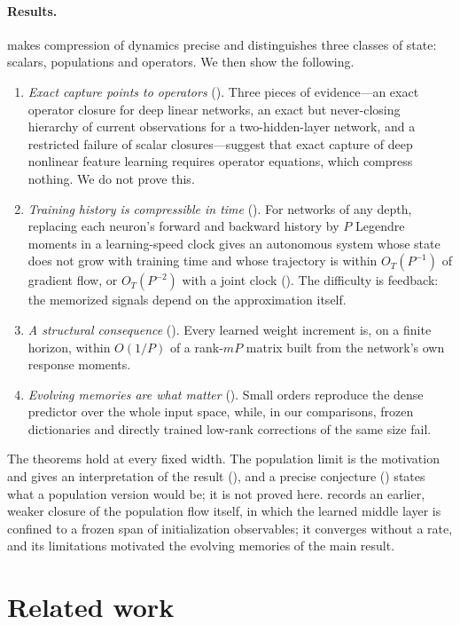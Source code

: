 \documentclass[11pt]{article}
\theoremstyle{definition}
\theoremstyle{remark}
\begin{document}
\paragraph{Results.}
 makes compression of dynamics precise and distinguishes three
classes of state: scalars, populations and operators.  We then show the
following.
\begin{enumerate}
\item \emph{Exact capture points to operators} ().  Three pieces
of evidence---an exact operator closure for deep linear networks, an exact but
never-closing hierarchy of current observations for a two-hidden-layer network,
and a restricted failure of scalar closures---suggest that
exact capture of deep nonlinear feature learning requires operator equations,
which compress nothing.  We do not prove this.
\item \emph{Training history is compressible in time} ().  For
networks of any depth, replacing each neuron's forward and backward history by
$P$ Legendre moments in a learning-speed clock gives an autonomous system whose
state does not grow with training time and whose trajectory is within
$O_T(P^{-1})$ of gradient flow, or $O_T(P^{-2})$ with a joint clock
().  The difficulty is feedback: the memorized signals
depend on the approximation itself.
\item \emph{A structural consequence} ().  Every learned weight
increment is, on a finite horizon, within $O(1/P)$ of a rank-$mP$ matrix built
from the network's own response moments.
\item \emph{Evolving memories are what matter} ().  Small
orders reproduce the dense predictor over the whole input space, while, in our
comparisons, frozen dictionaries and directly trained low-rank corrections of
the same size fail.
\end{enumerate}
The theorems hold at every fixed width.  The population limit is the motivation
and gives an interpretation of the result (), and a
precise conjecture () states what a population version
would be; it is not proved here.   records an earlier,
weaker closure of the population flow itself, in which the learned middle layer
is confined to a frozen span of initialization observables; it converges without
a rate, and its limitations motivated the evolving memories of the main result.

\section{Related work}
\label{sec:related}
\end{document}
